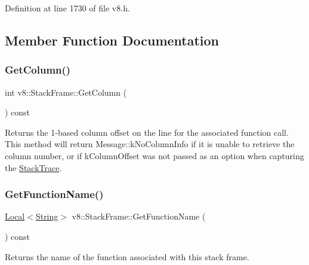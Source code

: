 Definition at line 1730 of file v8.\+h.



\subsection{Member Function Documentation}
\mbox{\label{classv8_1_1StackFrame_a3b4d7d29ae82b88304d09ea5c5e43db1}} 
\subsubsection{\texorpdfstring{Get\+Column()}{GetColumn()}}
{\footnotesize\ttfamily int v8\+::\+Stack\+Frame\+::\+Get\+Column (\begin{DoxyParamCaption}{ }\end{DoxyParamCaption}) const}

Returns the 1-\/based column offset on the line for the associated function call. This method will return Message\+::k\+No\+Column\+Info if it is unable to retrieve the column number, or if k\+Column\+Offset was not passed as an option when capturing the \mbox{\hyperlink{classv8_1_1StackTrace}{Stack\+Trace}}. \mbox{\label{classv8_1_1StackFrame_a9cd783598db74ab35bd4ae7c8cbc374f}} 
\subsubsection{\texorpdfstring{Get\+Function\+Name()}{GetFunctionName()}}
{\footnotesize\ttfamily \mbox{\hyperlink{classv8_1_1Local}{Local}}$<$\mbox{\hyperlink{classv8_1_1String}{String}}$>$ v8\+::\+Stack\+Frame\+::\+Get\+Function\+Name (\begin{DoxyParamCaption}{ }\end{DoxyParamCaption}) const}

Returns the name of the function associated with this stack frame. \mbox{\label{classv8_1_1StackFrame_a34ab9f48a06525cd9f93e01a70427ca2}} 
